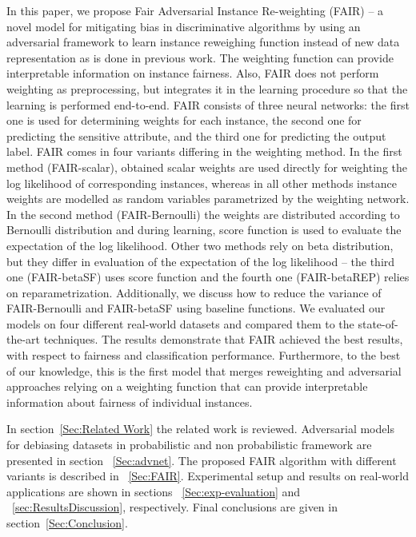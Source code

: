 \documentclass[preprint,12pt]{elsarticle}
\begin{document}
In this paper, we propose Fair Adversarial Instance Re-weighting (FAIR) -- a novel model for mitigating bias in discriminative algorithms by using an adversarial framework to learn instance reweighing function instead of new data representation as is done in previous work. The weighting function can provide interpretable information on instance fairness. Also, FAIR does not perform weighting as preprocessing, but integrates it in the learning procedure so that the learning is performed end-to-end. FAIR consists of three neural networks: the first one is used for determining weights for each instance, the second one for predicting the sensitive attribute, and the third one for predicting the output label. FAIR comes in four variants differing in the weighting method. In the first method (FAIR-scalar), obtained scalar weights are used directly for weighting the log likelihood of corresponding instances, whereas in all other methods instance weights are modelled as random variables parametrized by the weighting network. In the second method (FAIR-Bernoulli) the weights are distributed according to Bernoulli distribution and during learning, score function is used to evaluate the expectation of the log likelihood. Other two methods rely on beta distribution, but they differ in evaluation of the expectation of the log likelihood -- the third one (FAIR-betaSF) uses score function and the fourth one (FAIR-betaREP) relies on reparametrization. Additionally, we discuss how to reduce the variance of FAIR-Bernoulli and FAIR-betaSF using baseline functions. We evaluated our models on four different real-world datasets and compared them to the state-of-the-art techniques. The results demonstrate that FAIR achieved the best results, with respect to fairness and classification performance. Furthermore, to the best of our knowledge, this is the first model that merges reweighting and adversarial approaches relying on a weighting function that can provide interpretable information about fairness of individual instances.

In section~\ref{Sec:Related Work} the related work is reviewed. Adversarial models for debiasing datasets in probabilistic and non probabilistic framework are presented in section ~\ref{Sec:advnet}. The proposed FAIR algorithm with different variants is described in ~\ref{Sec:FAIR}.
Experimental setup and results on real-world applications are shown in sections ~\ref{Sec:exp-evaluation} and ~\ref{sec:ResultsDiscussion}, respectively. Final conclusions are given in section~\ref{Sec:Conclusion}.
\end{document}
